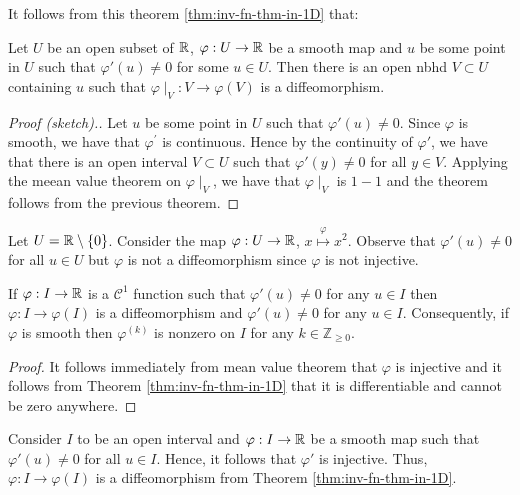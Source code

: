 It follows from this theorem \ref{thm:inv-fn-thm-in-1D} that:

\begin{theorem}
    Let $U$ be an open subset of $\mathbb R$, $\varphi : U \to \mathbb R$ be a smooth map and $u$ be some point in $U$ such that $\varphi ' \left( u \right) \ne 0$ for some $u\in U$. Then there is an open nbhd $V \subset U$ containing $u$ such that $\varphi \mid _{V} : V \to \varphi \left( V \right)$ is a diffeomorphism.
    \label{def:inv-fn-thm-in-1D-gen-style}
\end{theorem}
\begin{proof}[Proof (sketch).]
    Let $u$ be some point in $U$ such that $\varphi ' \left( u \right) \ne 0$. Since $\varphi$ is smooth, we have that $\varphi ^{'}$ is continuous. Hence by the continuity of $\varphi '$, we have that there is an open interval $V \subset U$ such that $\varphi ' \left( y \right) \ne 0$ for all $y\in V$. Applying the meean value theorem on $\varphi \mid_{V}$, we have that $\varphi \mid _{V}$ is $1-1$ and the theorem follows from the previous theorem.
\end{proof}

\begin{example} Let $U= \mathbb R \setminus \left\{ 0 \right\}$.
    Consider the map $\varphi : U \to \mathbb R$, $x \stackrel{\varphi}{\mapsto} x^{2}$.  Observe that $\varphi ' \left( u \right) \ne 0$ for all $u \in U$ but $\varphi$ is not a diffeomorphism since $\varphi$ is not injective.
\end{example}

\begin{observation}
    If $\varphi : I \to \mathbb R$ is a $\mathcal C ^{1}$ function such that $\varphi ' (u)\ne 0$ for any $u\in I$ then $\varphi : I \to \varphi (I)$ is a diffeomorphism and $\varphi ' (u) \ne 0$ for any $u \in I$. Consequently, if $\varphi$ is smooth then $\varphi ^{\left( k \right)}$ is nonzero on $I$ for any $k\in \mathbb Z_{\ge 0}$.
    \label{obs:smooth-and-non-zero}
\end{observation}
\begin{proof}
    It follows immediately from mean value theorem that $\varphi$ is injective and it follows from Theorem \ref{thm:inv-fn-thm-in-1D} that it is differentiable and cannot be zero anywhere.
\end{proof}

\begin{remark}
    
Consider $I$ to be an open interval and $\varphi : I \to \mathbb R$ be a smooth map such that $\varphi ' \left( u \right) \ne 0$ for all $u \in I$. Hence, it follows that $\varphi '$ is injective. Thus, $\varphi : I \to \varphi (I)$ is a diffeomorphism from Theorem \ref{thm:inv-fn-thm-in-1D}.
    \label{rem:a-remark-1}
\end{remark}


